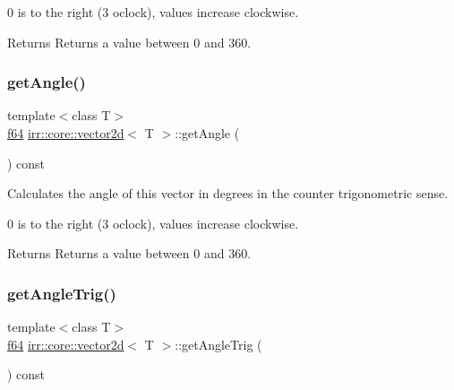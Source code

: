 0 is to the right (3 o\textquotesingle{}clock), values increase clockwise. \begin{DoxyReturn}{Returns}
Returns a value between 0 and 360. 
\end{DoxyReturn}
\mbox{\label{classirr_1_1core_1_1vector2d_ad41700e8cbebb9899430c576140ee6fd}} 
\subsubsection{\texorpdfstring{get\+Angle()}{getAngle()}\hspace{0.1cm}{\footnotesize\ttfamily [2/2]}}
{\footnotesize\ttfamily template$<$class T$>$ \\
\hyperlink{namespaceirr_a1325b02603ad449f92c68fc640af9b28}{f64} \hyperlink{classirr_1_1core_1_1vector2d}{irr\+::core\+::vector2d}$<$ T $>$\+::get\+Angle (\begin{DoxyParamCaption}{ }\end{DoxyParamCaption}) const\hspace{0.3cm}{\ttfamily [inline]}}



Calculates the angle of this vector in degrees in the counter trigonometric sense. 

0 is to the right (3 o\textquotesingle{}clock), values increase clockwise. \begin{DoxyReturn}{Returns}
Returns a value between 0 and 360. 
\end{DoxyReturn}
\mbox{\label{classirr_1_1core_1_1vector2d_a5aa73f5d0487d651af7dd3ea4a51ea67}} 
\subsubsection{\texorpdfstring{get\+Angle\+Trig()}{getAngleTrig()}\hspace{0.1cm}{\footnotesize\ttfamily [1/2]}}
{\footnotesize\ttfamily template$<$class T$>$ \\
\hyperlink{namespaceirr_a1325b02603ad449f92c68fc640af9b28}{f64} \hyperlink{classirr_1_1core_1_1vector2d}{irr\+::core\+::vector2d}$<$ T $>$\+::get\+Angle\+Trig (\begin{DoxyParamCaption}{ }\end{DoxyParamCaption}) const\hspace{0.3cm}{\ttfamily [inline]}}



